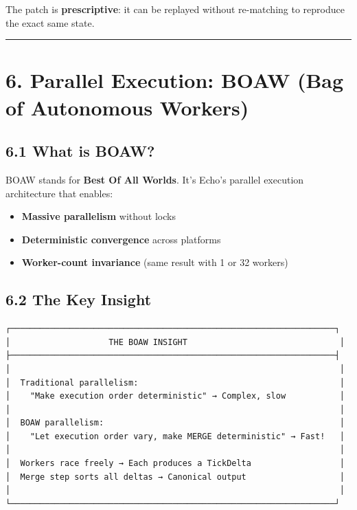 \documentclass[
]{book}
\providecommand{\tightlist}{%
  \setlength{\itemsep}{0pt}\setlength{\parskip}{0pt}}
\begin{document}
The patch is \textbf{prescriptive}: it can be replayed without
re-matching to reproduce the exact same state.

\begin{center}\rule{0.5\linewidth}{0.5pt}\end{center}

\section{6. Parallel Execution: BOAW (Bag of Autonomous
Workers)}\label{parallel-execution-boaw-bag-of-autonomous-workers}

\subsection{6.1 What is BOAW?}\label{what-is-boaw}

BOAW stands for \textbf{Best Of All Worlds}. It's Echo's parallel
execution architecture that enables:

\begin{itemize}
\tightlist
\item
  \textbf{Massive parallelism} without locks
\item
  \textbf{Deterministic convergence} across platforms
\item
  \textbf{Worker-count invariance} (same result with 1 or 32 workers)
\end{itemize}

\subsection{6.2 The Key Insight}\label{the-key-insight}

\begin{verbatim}
┌──────────────────────────────────────────────────────────────────┐
│                    THE BOAW INSIGHT                               │
├──────────────────────────────────────────────────────────────────┤
│                                                                   │
│  Traditional parallelism:                                         │
│    "Make execution order deterministic" → Complex, slow           │
│                                                                   │
│  BOAW parallelism:                                                │
│    "Let execution order vary, make MERGE deterministic" → Fast!   │
│                                                                   │
│  Workers race freely → Each produces a TickDelta                  │
│  Merge step sorts all deltas → Canonical output                   │
│                                                                   │
└──────────────────────────────────────────────────────────────────┘
\end{verbatim}
\end{document}

